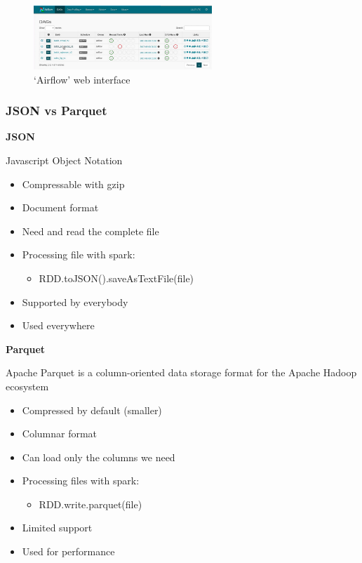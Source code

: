\documentclass{article}
\begin{document}
\begin{figure}[H]
    \centering
    \includegraphics[width=0.6\textwidth]{airflow.png}
    \caption{`Airflow' web interface}
\end{figure}

\subsubsection{JSON vs Parquet}

\textbf{JSON}

Javascript Object Notation

\begin{itemize}
    \item Compressable with gzip
    \item Document format
    \item Need and read the complete file
    \item Processing file with spark:
    \begin{itemize}
        \item RDD.toJSON().saveAsTextFile(file)
    \end{itemize}
    \item Supported by everybody
    \item Used everywhere
\end{itemize}

\textbf{Parquet}

Apache Parquet is a column-oriented data storage format for the Apache Hadoop ecosystem

\begin{itemize}
    \item Compressed by default (smaller)
    \item Columnar format
    \item Can load only the columns we need
    \item Processing files with spark:
    \begin{itemize}
        \item RDD.write.parquet(file)
    \end{itemize}
    \item Limited support
    \item Used for performance
\end{itemize}
\end{document}
